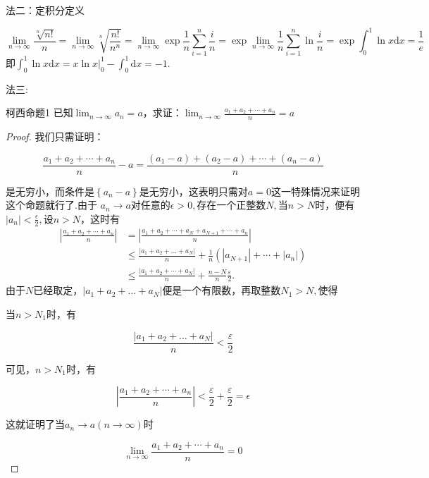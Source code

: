 \begin{xiti}
\begin{solution}
\begin{enumerate}
		法二：定积分定义
		
		\[
		\lim _{n \rightarrow \infty} \frac{\sqrt[n]{n !}}{n}=\lim _{n \rightarrow \infty} \sqrt[n]{\frac{n !}{n^{n}}}=\lim _{n \rightarrow \infty} \exp{\frac{1}{n} \sum_{i=1}^{n} \frac{i}{n}}=\exp{\lim _{n \rightarrow \infty} \frac{1}{n} \sum_{i=1}^{n} \ln \frac{i}{n}}=\exp\int_{0}^{1} \ln x \mathrm{d} x=\frac{1}{e}
		\]
		即$\int_{0}^{1} \ln x \mathrm{d} x=x \ln \left.x\right|_{0} ^{1}-\int_{0}^{1} \mathrm{d} x=-1$.
		
		法三:
		\begin{theorem}{柯西命题}{1}
			已知$\lim_{n \rightarrow \infty}a_n=a$，求证：$\lim_{n\rightarrow\infty}\frac{a_1+a_2+\cdots +a_n}{n}=a$
		\end{theorem}
			\begin{proof}
			我们只需证明：
			
			\[\frac{a_{1}+a_{2}+\cdots+a_{n}}{n}-a=\frac{\left(a_{1}-a\right)+\left(a_{2}-a\right)+\cdots+\left(a_{n}-a\right)}{n}\]
			
			是无穷小，而条件是$\left\{a_n-a\right\}$是无穷小，这表明只需对$a=0$这一特殊情况来证明这个命题就行了.由于 $a_n \rightarrow a$对任意的$\epsilon>0,$存在一个正整数$N,$当$n>N$时，便有$|a_n|<\frac{\epsilon}{2},$设$n>N$，这时有
			\begin{align*}
			\left|\frac{a_{1}+a_{2}+\cdots+a_{n}}{n}\right|&=\left|\frac{a_{1}+a_{2}+\cdots+a_{N}+a_{N+1}+\cdots+a_{n}}{n}\right|\\
			&\leqslant \frac{\left|a_{1}+a_{2}+\dots+a_{N}\right|}{n}+\frac{1}{n}\left(\left|a_{N+1}\right|+\cdots+\left|a_{n}\right|\right)\\
			&\leqslant \frac{\left|a_{1}+a_{2}+\cdots+a_{N}\right|}{n}+\frac{n-N}{n} \frac{\varepsilon}{2}.
			\end{align*}
			由于$N$已经取定，$\left|a_{1}+a_{2}+\dots+a_{N}\right|$便是一个有限数，再取整数$N_1>N,$使得
			
			当$n>N_1$时，有
			
			$$\frac{\left|a_{1}+a_{2}+\dots+a_{N}\right|}{n}<\frac{\varepsilon}{2}$$
			
			可见，$n>N_1$时，有
			
			$$\left|\frac{a_{1}+a_{2}+\cdots+a_{n}}{n}\right|<\frac{\varepsilon}{2}+\frac{\varepsilon}{2}=\epsilon$$
			
			这就证明了当$a_{n}\rightarrow a (n\rightarrow\infty)$时
			
			$$ 
			\lim _{n \rightarrow \infty} \frac{a_{1}+a_{2}+\cdots+a_{n}}{n}=0
			$$
			

\end{proof}
\end{enumerate}
\end{solution}
\end{xiti}
